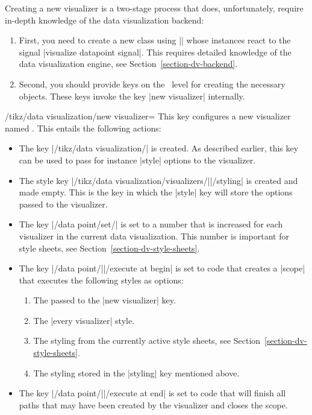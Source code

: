 Creating a new visualizer is a two-stage process that does,
unfortunately, require in-depth knowledge of the data
visualization backend:
\begin{enumerate}
\item First, you need to create a new class using |\pgfooclass| whose
  instances react to the signal |visualize datapoint signal|. This requires
  detailed knowledge of the data visualization engine, see
  Section~\ref{section-dv-backend}.
\item Second, you should provide keys on the \tikzname\ level for
  creating the necessary objects. These keys invoke the key
  |new visualizer| internally.
\end{enumerate}

\begin{key}{/tikz/data visualization/new visualizer=}
  This key configures a new visualizer named . This entails
  the following actions:
  \begin{itemize}
  \item The key |/tikz/data visualization/| is
    created. As described earlier, this key can be used to pass
    for instance |style| options to the visualizer.
  \item The style key |/tikz/data visualization/visualizers/||/styling|
    is created and made empty. This is the key in which the |style|
    key will store the options passed to the visualizer.
  \item The key |/data point/set/| is set to a
    number that is increased for each visualizer in the current data
    visualization. This number is important for style sheets, see
    Section~\ref{section-dv-style-sheets}.
  \item The key |/data point/||/execute at begin| is set to
    code that creates a |{scope}| that executes the following styles
    as options:
    \begin{enumerate}
    \item The  passed to the |new visualizer| key.
    \item The |every visualizer| style.
    \item The styling from the currently active style sheets, see
      Section~\ref{section-dv-style-sheets}. 
    \item The styling stored in the |styling| key mentioned above.
    \end{enumerate}
  \item The key |/data point/||/execute at end| is set to
    code that will finish all paths that may have been created by the
    visualizer and closes the scope.
  \end{itemize}
  

\end{key}
